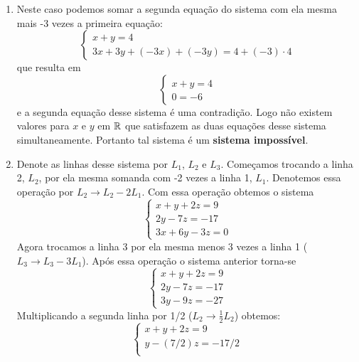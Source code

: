 \begin{exemplos}
	\begin{solucao}
		\begin{enumerate}[label={\arabic*})]
			\item Neste caso podemos somar a segunda equação do sistema com ela mesma mais -3 vezes a primeira equação:
				\[
					\begin{cases}
						x + y = 4\\
						3x + 3y + (-3x) + (-3y) = 4 + (-3)\cdot 4
					\end{cases}
				\]
			que resulta em
			\[
				\begin{cases}
					x + y = 4\\
					0 = -6
				\end{cases}
			\]
			e a segunda equação desse sistema é uma contradição. Logo não existem valores para $x$ e $y$ em $\mathbb{R}$ que satisfazem as duas equações desse sistema simultaneamente. Portanto tal sistema é um \textbf{sistema impossível}.
                    \item Denote as linhas desse sistema por $L_1$, $L_2$ e $L_3$. Começamos trocando a linha 2, $L_2$, por ela mesma somanda com -2 vezes a linha 1, $L_1$. Denotemos essa operação por $L_2 \to L_2 - 2L_1$. Com essa operação obtemos o sistema
                        \[
                            \begin{cases}
                                x + y + 2z = 9\\
                                2y - 7z = -17\\
                                3x + 6y - 3z = 0
                            \end{cases}
                        \]
                        Agora trocamos a linha 3 por ela mesma menos 3 vezes a linha 1 ($L_3 \to L_3 - 3L_1$). Após essa operação o sistema anterior torna-se
                        \[
                            \begin{cases}
                                x + y + 2z = 9\\
                                2y - 7z = -17\\
                                3y - 9z = -27
                            \end{cases}
                        \]
                        Multiplicando a segunda linha por 1/2 ($L_2 \to \frac{1}{2}L_2$) obtemos:
                        \[
                            \begin{cases}
                                x + y + 2z = 9\\
                                y - (7/2)z = -17/2\\

\end{cases}\]
\end{enumerate}
\end{solucao}
\end{exemplos}
